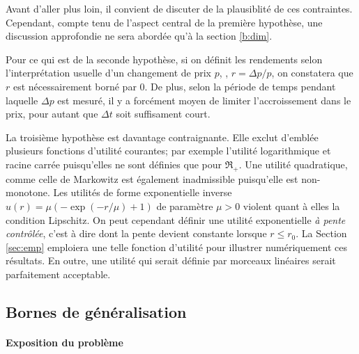 Avant d'aller plus loin, il convient de discuter de la plausiblité de ces
contraintes. Cependant, compte tenu de l'aspect central de la première hypothèse, une
discussion approfondie ne sera abordée qu'à la section \ref{b:dim}.

Pour ce qui est de la seconde hypothèse, si on définit les rendements selon
l'interprétation usuelle d'un changement de prix $p$, \ie, $r = \Delta p/p$, on constatera que
$r$ est nécessairement borné par 0. De plus, selon la période de temps pendant laquelle
$\Delta p$ est mesuré, il y a forcément moyen de limiter l'accroissement dans le prix, pour
autant que $\Delta t$ soit suffisament court.

La troisième hypothèse est davantage contraignante. Elle exclut d'emblée plusieurs
fonctions d'utilité courantes; par exemple l'utilité logarithmique et racine carrée
puisqu'elles ne sont définies que pour $\Re_{+}$. Une utilité quadratique, comme celle de
Markowitz est également inadmissible puisqu'elle est non-monotone. Les utilités de forme
exponentielle inverse $u(r) = \mu(-\exp(-r/\mu)+1)$ de paramètre $\mu > 0$ violent quant à elles
la condition Lipschitz. On peut cependant définir une utilité exponentielle \textit{à
  pente contrôlée}, c'est à dire dont la pente devient constante lorsque $r \leq r_0$. La
Section \ref{sec:emp} emploiera une telle fonction d'utilité pour illustrer numériquement
ces résultats. En outre, une utilité qui serait définie par morceaux linéaires serait
parfaitement acceptable. 


\subsection{Bornes de généralisation}
\label{b:gen}


\paragraph{Exposition du problème}

